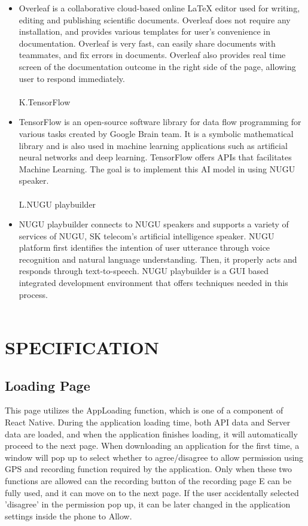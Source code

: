 \documentclass[conference]{IEEEtran}
\begin{document}
\begin{itemize}
\item Overleaf is a collaborative cloud-based online LaTeX editor used for writing, editing and publishing scientific documents. Overleaf does not require any installation, and provides various templates for user's convenience in documentation. Overleaf is very fast, can easily share documents with teammates, and fix errors in documents. Overleaf also provides real time screen of the documentation outcome in the right side of the page, allowing user to respond immediately.\\
\\
K.TensorFlow\\
\item TensorFlow is an open-source software library for data flow programming for various tasks created by Google Brain team. It is a symbolic mathematical library and is also used in machine learning applications such as artificial neural networks and deep learning. TensorFlow offers APIs that facilitates Machine Learning. The goal is to implement this AI model in using NUGU speaker.\\
\\
L.NUGU playbuilder\\
\item NUGU playbuilder connects to NUGU speakers and supports a variety of services of NUGU, SK telecom’s artificial intelligence speaker. NUGU platform first identifies the intention of user utterance through voice recognition and natural language understanding. Then, it properly acts and responds through text-to-speech. NUGU playbuilder is a GUI based integrated development environment that offers techniques needed in this process.\\
\\
\end{itemize}



\section{SPECIFICATION}
\subsection{Loading Page}\label{AA}
This page utilizes the AppLoading function, which is one of a component of React Native. During the application loading time, both API data and Server data are loaded, and when the application finishes loading, it will automatically proceed to the next page. When downloading an application for the first time, a window will pop up to select whether to agree/disagree to allow permission using GPS and recording function required by the application. Only when these two functions are allowed can the recording button of the recording page E can be fully used, and it can move on to the next page. If the user accidentally selected 'disagree' in the permission pop up, it can be later changed in the application settings inside the phone to Allow.
\\
\end{document}
